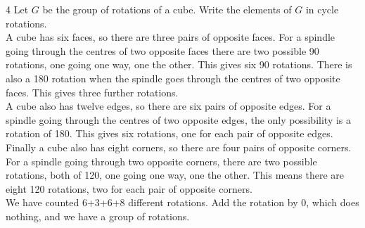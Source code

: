 \begin{example}4
    Let $G$ be the group of rotations of a cube. Write the elements
    of $G$ in cycle rotations.\\

    A cube has six faces, so there are three pairs of opposite faces. For a spindle
    going through the centres of two opposite faces there are two possible
    90 rotations, one going one way, one the other. This gives six 90 rotations.
    There is also a 180 rotation when the spindle goes through the centres of
    two opposite faces. This gives three further rotations.\\

    A cube also has twelve edges, so there are six pairs of opposite edges. For a
    spindle going through the centres of two opposite edges, the only possibility 
    is a rotation of 180. This gives six rotations, one for each pair of opposite
    edges. \\ 

    Finally a cube also has eight corners, so there are four pairs of opposite corners.
    For a spindle going through two opposite corners, there are two possible
     rotations, both of 120, one going one way, one the other. This means
    there are eight 120 rotations, two for each pair of opposite corners. \\

    We have counted 6+3+6+8 different rotations. Add the rotation by 0, which
        does nothing, and we have a group of  rotations.
\end{example}
